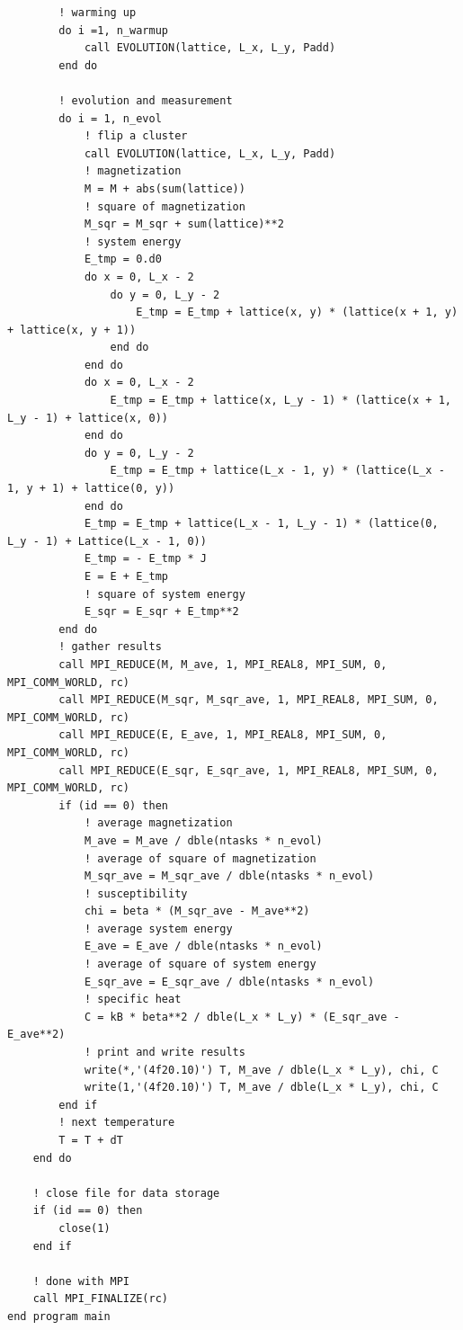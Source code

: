 \documentclass[UTF8,10pt,a4paper]{article}
\theoremstyle{Problem}
\theoremstyle{Solution}
\begin{document}
\begin{lstlisting}
        ! warming up
        do i =1, n_warmup
            call EVOLUTION(lattice, L_x, L_y, Padd)
        end do

        ! evolution and measurement
        do i = 1, n_evol
            ! flip a cluster
            call EVOLUTION(lattice, L_x, L_y, Padd)
            ! magnetization
            M = M + abs(sum(lattice))
            ! square of magnetization
            M_sqr = M_sqr + sum(lattice)**2
            ! system energy
            E_tmp = 0.d0
            do x = 0, L_x - 2
                do y = 0, L_y - 2
                    E_tmp = E_tmp + lattice(x, y) * (lattice(x + 1, y) + lattice(x, y + 1))
                end do
            end do
            do x = 0, L_x - 2
                E_tmp = E_tmp + lattice(x, L_y - 1) * (lattice(x + 1, L_y - 1) + lattice(x, 0))
            end do
            do y = 0, L_y - 2
                E_tmp = E_tmp + lattice(L_x - 1, y) * (lattice(L_x - 1, y + 1) + lattice(0, y))
            end do
            E_tmp = E_tmp + lattice(L_x - 1, L_y - 1) * (lattice(0, L_y - 1) + Lattice(L_x - 1, 0))
            E_tmp = - E_tmp * J
            E = E + E_tmp
            ! square of system energy
            E_sqr = E_sqr + E_tmp**2
        end do
        ! gather results
        call MPI_REDUCE(M, M_ave, 1, MPI_REAL8, MPI_SUM, 0, MPI_COMM_WORLD, rc)
        call MPI_REDUCE(M_sqr, M_sqr_ave, 1, MPI_REAL8, MPI_SUM, 0, MPI_COMM_WORLD, rc)
        call MPI_REDUCE(E, E_ave, 1, MPI_REAL8, MPI_SUM, 0, MPI_COMM_WORLD, rc)
        call MPI_REDUCE(E_sqr, E_sqr_ave, 1, MPI_REAL8, MPI_SUM, 0, MPI_COMM_WORLD, rc)
        if (id == 0) then
            ! average magnetization
            M_ave = M_ave / dble(ntasks * n_evol)
            ! average of square of magnetization
            M_sqr_ave = M_sqr_ave / dble(ntasks * n_evol)
            ! susceptibility
            chi = beta * (M_sqr_ave - M_ave**2)
            ! average system energy
            E_ave = E_ave / dble(ntasks * n_evol)
            ! average of square of system energy
            E_sqr_ave = E_sqr_ave / dble(ntasks * n_evol)
            ! specific heat
            C = kB * beta**2 / dble(L_x * L_y) * (E_sqr_ave - E_ave**2)
            ! print and write results
            write(*,'(4f20.10)') T, M_ave / dble(L_x * L_y), chi, C
            write(1,'(4f20.10)') T, M_ave / dble(L_x * L_y), chi, C
        end if
        ! next temperature
        T = T + dT
    end do

    ! close file for data storage
    if (id == 0) then
        close(1)
    end if

    ! done with MPI
    call MPI_FINALIZE(rc)
end program main


\end{lstlisting}
\end{document}
